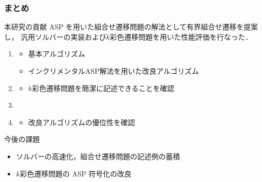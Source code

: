 \documentclass[dvipdfmx,11pt]{beamer}
\begin{document}
\begin{frame}\frametitle{まとめ}

  \begin{alertblock}{本研究の貢献}\centering
    ASP を用いた組合せ遷移問題の解法として有界組合せ遷移を提案し，
    汎用ソルバーの実装および$k$彩色遷移問題を用いた性能評価を行なった．
  \end{alertblock}

  \begin{enumerate}
  \item {}
    \begin{itemize}
    \item 基本アルゴリズム
    \item インクリメンタルASP解法を用いた改良アルゴリズム
    \end{itemize}
  \item {}
    \begin{itemize}
    \item $k$彩色遷移問題を簡潔に記述できることを確認
    \end{itemize}
  \item {}
  \item {}
    \begin{itemize}
    \item 改良アルゴリズムの優位性を確認
    \end{itemize}
  \end{enumerate}
  
  \begin{exampleblock}{今後の課題}
    \begin{itemize}
      \item ソルバーの高速化，組合せ遷移問題の記述例の蓄積
      \item $k$彩色遷移問題の ASP 符号化の改良
    \end{itemize}
  \end{exampleblock}
\end{frame}

\end{document}
